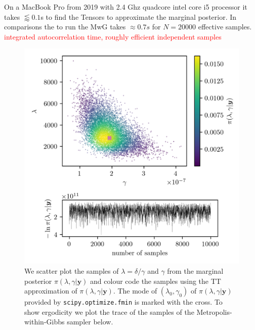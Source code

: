 On a MacBook Pro from 2019 with 2.4 Ghz quadcore intel core i5 processor it takes $\lessapprox  0.1$s to find the Tensors to approximate the marginal posterior.
In comparisons the to run the MwG takes $\approx 0.7s$ for $N = 20000$ effective samples.
\textcolor{red}{integrated autocorrelation time, roughly efficient independent samples}
\begin{figure}[ht!]
	\centering
	\includegraphics{ScatterplusHistoPlusTT.png}
	\caption[Scatter plot of samples from marginal posterior, including weighting from TT approximation; additional trace plot of the marginal posterior samples.]{We scatter plot the samples of $\lambda = \delta / \gamma $ and $\gamma$ from the marginal posterior $\pi(\lambda , \gamma  | \bm{y})$ and colour code the samples using the TT approximation of $\pi(\lambda , \gamma  | \bm{y})$. The mode of $(\lambda_0 , \gamma_0)$ of $\pi(\lambda , \gamma  | \bm{y})$ provided by \texttt{scipy.optimize.fmin} is marked with the cross. To show ergodicity we plot the trace of the samples of the Metropolis-within-Gibbs sampler below.}
	\label{fig:ScatterPlotTT}
\end{figure}


